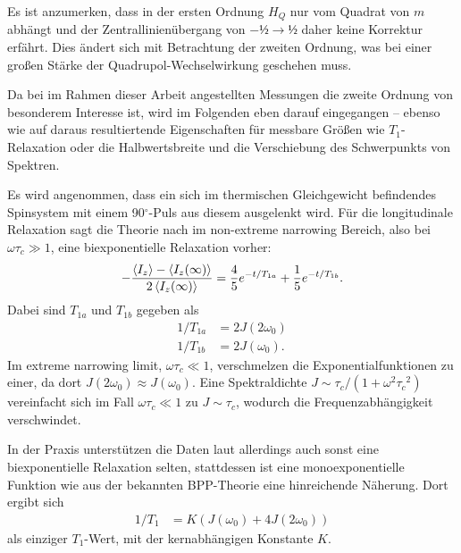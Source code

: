 Es ist anzumerken, dass in der ersten Ordnung $H_Q$ nur vom Quadrat von $m$ abhängt und der Zentrallinienübergang von $-½ \to ½$ daher keine Korrektur erfährt. Dies ändert sich mit Betrachtung der zweiten Ordnung, was bei einer großen Stärke der Quadrupol-Wechselwirkung geschehen muss.

\par\bigskip

Da bei im Rahmen dieser Arbeit angestellten Messungen die zweite Ordnung von besonderem Interesse ist, wird im Folgenden eben darauf eingegangen -- ebenso wie auf daraus resultiertende Eigenschaften für messbare Größen wie $T_1$-Relaxation oder die Halbwertsbreite und die Verschiebung des Schwerpunkts von Spektren.

Es wird angenommen, dass ein sich im thermischen Gleichgewicht befindendes Spinsystem mit einem 90$^\circ$-Puls aus diesem ausgelenkt wird. Für die longitudinale Relaxation sagt die Theorie nach \cite{hubbard} im non-extreme narrowing Bereich, also bei $\omega \tau_c \gg 1$, eine biexponentielle Relaxation vorher:
\begin{align}
    - \frac{\Braket{I_z} - \Braket{I_z(\infty)}}{2\Braket{I_z(\infty)}} = \frac{4}{5}e^{-t/T_{1a}} + \frac{1}{5}e^{-t/T_{1b}}.
\end{align}
Dabei sind $T_{1a}$ und $T_{1b}$ gegeben als
\begin{align}
    1/T_{1a} &= 2J(2\omega_0) \\
    1/T_{1b} &= 2J(\omega_0).
\end{align}
Im extreme narrowing limit, $\omega \tau_c \ll 1$, verschmelzen die Exponentialfunktionen zu einer, da dort $J(2\omega_0) \approx J(\omega_0)$. Eine Spektraldichte $J \sim \tau_c / (1 + \omega^2 {\tau_c}^2)$ vereinfacht sich im Fall $\omega \tau_c \ll 1$ zu $J \sim \tau_c$, wodurch die Frequenzabhängigkeit verschwindet.

In der Praxis unterstützen die Daten laut \cite{eckert} allerdings auch sonst eine biexponentielle Relaxation selten, stattdessen ist eine monoexponentielle Funktion wie aus der bekannten BPP-Theorie \cite{bpp} eine hinreichende Näherung. Dort ergibt sich
\begin{align}
    1/T_1 &= K (J(\omega_0) + 4J(2\omega_0)) \label{eqn:bpp}
\end{align}
als einziger $T_1$-Wert, mit der kernabhängigen Konstante $K$.

